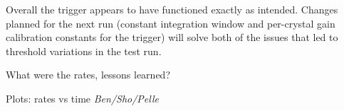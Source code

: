 Overall the trigger appears to have functioned exactly as intended. Changes planned for the next run (constant integration window and per-crystal gain calibration constants for the trigger) will solve both of the issues that led to threshold variations in the test run.

{\color{red}
What were the rates, lessons learned?

Plots: rates vs time {\it Ben/Sho/Pelle}}


